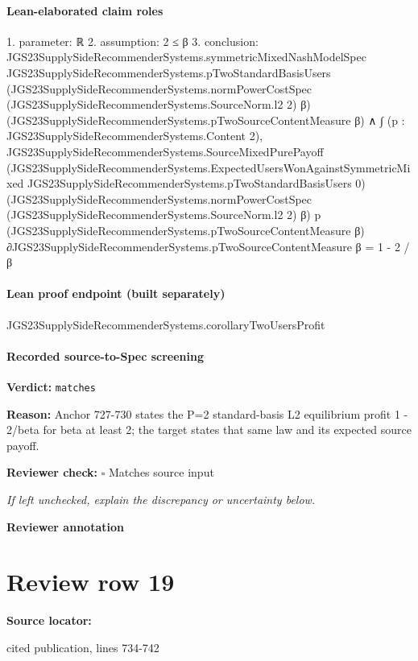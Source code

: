 \documentclass[10pt]{article}
\newcommand{\reviewerbox}{%
  \par\noindent\fbox{\parbox{0.96\linewidth}{\rule{0pt}{0.38in}}}\par
}
\newcommand{\reviewmatch}[1]{%
  \par\noindent\textbf{Reviewer check:} $\square$\; #1\par
  \noindent\emph{If left unchecked, explain the discrepancy or uncertainty below.}\par
}
\begin{document}
\paragraph{Lean-elaborated claim roles}\begin{ReviewVerbatim}
1. parameter: ℝ
2. assumption: 2 ≤ β
3. conclusion: JGS23SupplySideRecommenderSystems.symmetricMixedNashModelSpec JGS23SupplySideRecommenderSystems.pTwoStandardBasisUsers
    (JGS23SupplySideRecommenderSystems.normPowerCostSpec (JGS23SupplySideRecommenderSystems.SourceNorm.l2 2) β)
    (JGS23SupplySideRecommenderSystems.pTwoSourceContentMeasure β) ∧
  ∫ (p : JGS23SupplySideRecommenderSystems.Content 2),
      JGS23SupplySideRecommenderSystems.SourceMixedPurePayoff
        (JGS23SupplySideRecommenderSystems.ExpectedUsersWonAgainstSymmetricMixed
          JGS23SupplySideRecommenderSystems.pTwoStandardBasisUsers 0)
        (JGS23SupplySideRecommenderSystems.normPowerCostSpec (JGS23SupplySideRecommenderSystems.SourceNorm.l2 2) β) p
        (JGS23SupplySideRecommenderSystems.pTwoSourceContentMeasure
          β) ∂JGS23SupplySideRecommenderSystems.pTwoSourceContentMeasure β =
    1 - 2 / β
\end{ReviewVerbatim}

\paragraph{Lean proof endpoint (built separately)}\begin{ReviewVerbatim}
JGS23SupplySideRecommenderSystems.corollaryTwoUsersProfit
\end{ReviewVerbatim}

\paragraph{Recorded source-to-Spec screening}
\textbf{Verdict:} \texttt{matches}
\\
{\raggedright
\textbf{Reason:} Anchor 727-\allowbreak{}730 states the P=2 standard-\allowbreak{}basis L2 equilibrium profit 1 -\allowbreak{} 2/\allowbreak{}beta for beta at least 2;\allowbreak{} the target states that same law and its expected source payoff.\allowbreak{}
\par}
\reviewmatch{Matches source input}
\noindent\textbf{Reviewer annotation}\par
\reviewerbox
\clearpage
\hypertarget{source-claim-eab7d2ebbe6b0e4f}{}
\section*{Review row 19}
\textbf{Source locator:} {\footnotesize\raggedright cited publication, lines 734-\allowbreak{}742\par}
\end{document}
